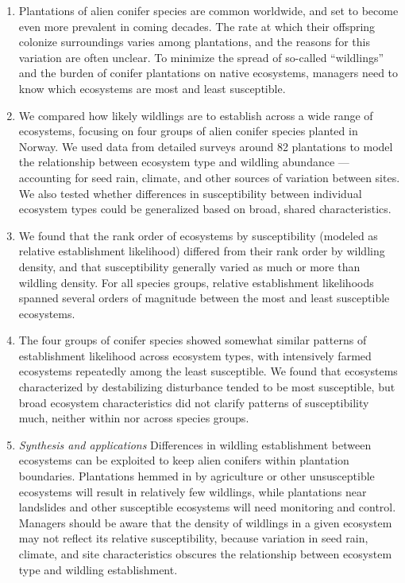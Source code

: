 \documentclass[
]{article}
\providecommand{\tightlist}{%
  \setlength{\itemsep}{0pt}\setlength{\parskip}{0pt}}
\begin{document}
\begin{enumerate}
\def\labelenumi{\arabic{enumi}.}
\tightlist
\item
  Plantations of alien conifer species are common worldwide, and set to become even more prevalent in coming decades. The rate at which their offspring colonize surroundings varies among plantations, and the reasons for this variation are often unclear. To minimize the spread of so-called ``wildlings'' and the burden of conifer plantations on native ecosystems, managers need to know which ecosystems are most and least susceptible.
\item
  We compared how likely wildlings are to establish across a wide range of ecosystems, focusing on four groups of alien conifer species planted in Norway. We used data from detailed surveys around 82 plantations to model the relationship between ecosystem type and wildling abundance --- accounting for seed rain, climate, and other sources of variation between sites. We also tested whether differences in susceptibility between individual ecosystem types could be generalized based on broad, shared characteristics.
\item
  We found that the rank order of ecosystems by susceptibility (modeled as relative establishment likelihood) differed from their rank order by wildling density, and that susceptibility generally varied as much or more than wildling density. For all species groups, relative establishment likelihoods spanned several orders of magnitude between the most and least susceptible ecosystems.
\item
  The four groups of conifer species showed somewhat similar patterns of establishment likelihood across ecosystem types, with intensively farmed ecosystems repeatedly among the least susceptible. We found that ecosystems characterized by destabilizing disturbance tended to be most susceptible, but broad ecosystem characteristics did not clarify patterns of susceptibility much, neither within nor across species groups.
\item
  \emph{Synthesis and applications} Differences in wildling establishment between ecosystems can be exploited to keep alien conifers within plantation boundaries. Plantations hemmed in by agriculture or other unsusceptible ecosystems will result in relatively few wildlings, while plantations near landslides and other susceptible ecosystems will need monitoring and control. Managers should be aware that the density of wildlings in a given ecosystem may not reflect its relative susceptibility, because variation in seed rain, climate, and site characteristics obscures the relationship between ecosystem type and wildling establishment.
\end{enumerate}
\end{document}
